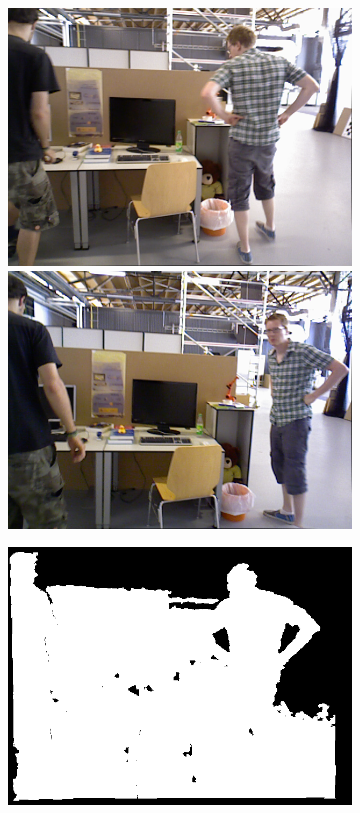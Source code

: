 \begin{figure}[!htbp]
    \centering
    \begin{subfigure}[b]{0.35\textwidth}
      \includegraphics[width=\textwidth]{Img/ori_63.png}
      \includegraphics[width=\textwidth]{Img/ori_87.png}
      \caption{}
      \label{fig:ori}
    \end{subfigure}%
    \begin{subfigure}[b]{0.35\textwidth}
      \includegraphics[width=\textwidth]{Img/depth_63.png}

\end{subfigure}
\end{figure}
